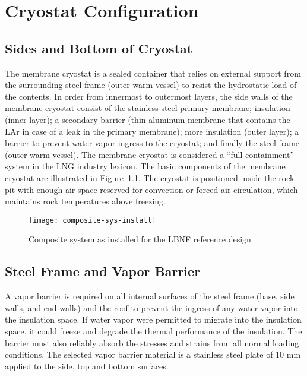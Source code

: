 
\chapter{Cryostat Configuration}
\label{Sec:cryo-cryosys-cryostat}

\section{Sides and Bottom of Cryostat}

The membrane cryostat is a sealed container that relies on external support 
from the surrounding steel frame (outer warm vessel) to resist the hydrostatic 
load of the contents. In order from innermost to outermost layers, the side 
walls of the membrane cryostat consist of the stainless-steel primary membrane; 
insulation (inner layer); a secondary barrier (thin aluminum membrane 
that contains the LAr in case of a leak in the primary membrane); 
more insulation (outer layer); a barrier to prevent water-vapor 
ingress to the cryostat; and finally the steel frame (outer warm vessel).  
The membrane cryostat is considered a ``full containment'' 
system in the LNG industry lexicon. The basic components of the 
membrane cryostat are illustrated in Figure~\ref{fig:composite-sys-install}.
The cryostat is positioned inside the rock pit with enough air space 
reserved for convection or forced air circulation, which maintains rock 
temperatures above freezing.

\begin{figure}[htbp]
\centering
\texttt{[image: composite-sys-install]}
\caption{Composite system as installed for the LBNF reference design} 
\label{fig:composite-sys-install}
\end{figure}


\section{Steel Frame and Vapor Barrier}

A vapor barrier is required on all internal surfaces of the 
steel frame (base, side walls, and end walls) and the roof to 
prevent the ingress of any water vapor into the insulation 
space. If water vapor were permitted to migrate into the 
insulation space, it could freeze and degrade the thermal 
performance of the insulation. The barrier must also 
reliably absorb the stresses and strains from all normal 
loading conditions. The selected vapor barrier material 
is a stainless steel plate of 10 mm applied to the side,
top and bottom surfaces. 

